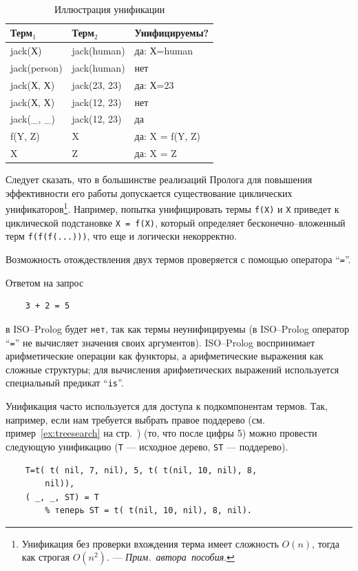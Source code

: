 \documentclass[12pt, openany, twoside]{book} %
\def\AR{{\em Прим.~автора~пособия}}
\begin{document}
\begin{table}[ht]
\begin{center}\tt
\begin{tabular}{|l|l|l|}
 \hline
 {\rm Терм${}_1$} & {\rm Терм${}_2$}  &  {\rm Унифицируемы?}
 \\\hline\hline
 jack(Х)  &  jack(human) & {\rm да:} Х=human
 \\\hline
 jack(person) & jack(human)  &  {\rm нет}
 \\\hline
 jack(Х, Х) & jack(23, 23)  &  {\rm да:} Х=23
 \\\hline
 jack(Х, Х) & jack(12, 23)  &  {\rm нет}
 \\\hline
 jack(\_, \_) & jack(12, 23)  &  {\rm да}
 \\\hline
 f(Y, Z) & X  &  {\rm да:} X = f(Y, Z)
  \\\hline
 X & Z  &  {\rm да:} X = Z
  \\\hline
\end{tabular}
\end{center}
\caption{Иллюстрация унификации} \label{tab:unif}
\end{table}

Следует сказать, что в большинстве реализаций Пролога для повышения эффективности его работы допускается существование циклических унификаторов\footnote{Унификация без проверки вхождения терма имеет сложность $O(n)$, тогда как строгая $O(n^2)$. --- \AR.}. Например, попытка унифицировать термы {\tt f(X)} и {\tt Х} приведет к циклической подстановке {\tt X = f(X)}, который определяет бесконечно--вложенный терм {\tt f(f(f(...)))}, что еще и логически некорректно.

Возможность отождествления двух термов проверяется с помощью оператора ``{\tt =}''.

Ответом на запрос
{\tt\begin{verbatim}
    3 + 2 = 5
\end{verbatim}}
\noindent в ISO--Prolog будет {\tt нет}, так как термы неунифицируемы (в ISO--Prolog оператор ``{\tt =}'' не вычисляет значения своих аргументов). ISO--Prolog воспринимает арифметические операции как функторы, а арифметические выражения как сложные структуры; для вычисления арифметических выражений используется специальный предикат ``{\tt is}''. %

Унификация часто используется для доступа к подкомпонентам термов. Так, например, если нам требуется выбрать правое поддерево (см. пример~\ref{ex:treesearch} на стр.~\pageref{ex:treesearch}) (то, что после цифры 5) можно провести следующую унификацию ({\tt T} --- исходное дерево, {\tt ST} --- поддерево). %
{\tt\begin{verbatim}
    T=t( t( nil, 7, nil), 5, t( t(nil, 10, nil), 8,
        nil)),
    ( _, _, ST) = T
        % теперь ST = t( t(nil, 10, nil), 8, nil).
\end{verbatim}}
\end{document}
